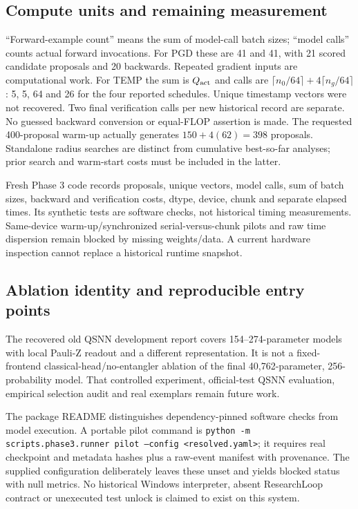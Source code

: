 \subsection{Compute units and remaining measurement}
``Forward-example count'' means the sum of model-call batch sizes; ``model calls'' counts actual forward invocations. For PGD these are 41 and 41, with 21 scored candidate proposals and 20 backwards. Repeated gradient inputs are computational work. For TEMP the sum is $Q_{\rm act}$ and calls are $\lceil n_0/64\rceil+4\lceil n_g/64\rceil$: 5, 5, 64 and 26 for the four reported schedules. Unique timestamp vectors were not recovered. Two final verification calls per new historical record are separate. No guessed backward conversion or equal-FLOP assertion is made. The requested 400-proposal warm-up actually generates $150+4(62)=398$ proposals. Standalone radius searches are distinct from cumulative best-so-far analyses; prior search and warm-start costs must be included in the latter.

Fresh Phase 3 code records proposals, unique vectors, model calls, sum of batch sizes, backward and verification costs, dtype, device, chunk and separate elapsed times. Its synthetic tests are software checks, not historical timing measurements. Same-device warm-up/synchronized serial-versus-chunk pilots and raw time dispersion remain blocked by missing weights/data. A current hardware inspection cannot replace a historical runtime snapshot.

\subsection{Ablation identity and reproducible entry points}
The recovered old QSNN development report covers 154--274-parameter models with local Pauli-Z readout and a different representation. It is not a fixed-frontend classical-head/no-entangler ablation of the final 40,762-parameter, 256-probability model. That controlled experiment, official-test QSNN evaluation, empirical selection audit and real exemplars remain future work.

The package README distinguishes dependency-pinned software checks from model execution. A portable pilot command is \texttt{python -m scripts.phase3.runner pilot --config <resolved.yaml>}; it requires real checkpoint and metadata hashes plus a raw-event manifest with provenance. The supplied configuration deliberately leaves these unset and yields blocked status with null metrics. No historical Windows interpreter, absent ResearchLoop contract or unexecuted test unlock is claimed to exist on this system.
